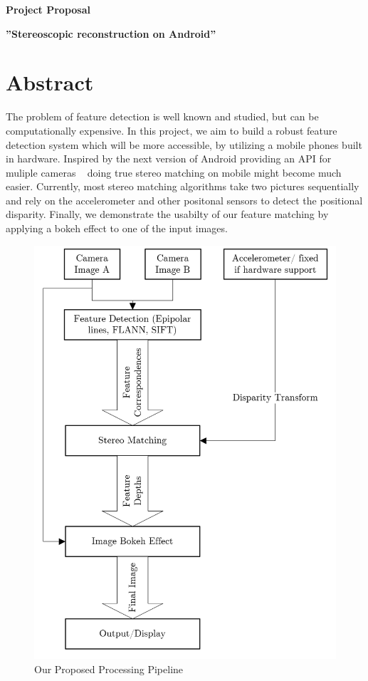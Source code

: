\documentclass[a4paper,pagesize 10pt]{scrartcl}
\begin{document}
\begin{center}{\Huge\textbf{Project Proposal}}\end{center}
\begin{center}{\Large\textbf{''Stereoscopic reconstruction on Android''}}\end{center}

\section{Abstract}

%
%
%
%
%
The problem of feature detection is well known and studied, but can be computationally expensive. In this project, we aim to build a robust feature detection system which will be more accessible, by utilizing a mobile phones built in hardware. Inspired by the next version of Android providing an API for muliple cameras ~\cite{AndroidPMultiCamera} doing true stereo matching on mobile might become much easier. Currently, most stereo matching algorithms take two pictures sequentially and rely on the accelerometer and other positonal sensors to detect the positional disparity. Finally, we demonstrate the usabilty of our feature matching by applying a bokeh effect to one of the input images.
\begin{figure}[h]
	\centering
	\includegraphics[scale=0.48]{Pipeline.PNG}
	\caption{Our Proposed Processing Pipeline}
\end{figure}
\end{document}
